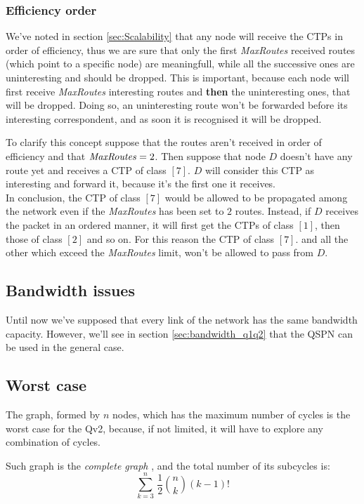 \documentclass[a4paper]{article}
\begin{document}
\subsubsection{Efficiency order}
\label{sec:eff_order}

We've noted in section \ref{sec:Scalability} that any node will receive the
CTPs in order of efficiency, thus we are sure that only the first
\emph{MaxRoutes} received routes (which point to a specific node) are
meaningfull, while all the successive ones are uninteresting and should be
dropped. This is important, because each
node will first receive \emph{MaxRoutes} interesting routes and
\textbf{then} the uninteresting ones, that will be dropped. 
Doing so, an uninteresting route won't be forwarded before its interesting
correspondent, and as soon it is recognised it will be dropped.

To clarify this concept suppose that the routes aren't received in order of
efficiency and that $\textrm{\emph{MaxRoutes}}=2$. Then suppose that node $D$ doesn't
have any route yet and receives a CTP of class $[7]$. $D$ will consider this
CTP as interesting and forward it, because it's the first one it receives.\\
In conclusion, the CTP of class $[7]$ would be allowed to be propagated among
the network even if the \emph{MaxRoutes} has been set to $2$ routes.
Instead, if $D$ receives the packet in an ordered
manner, it will first get the CTPs of class $[1]$, then those of class $[2]$
and so on. For this reason the CTP of class $[7]$. and all the other which
exceed the \emph{MaxRoutes} limit, won't be allowed to pass from $D$.

\subsection{Bandwidth issues}
Until now we've supposed that every link of the network has the same bandwidth
capacity. However, we'll see in section \ref{sec:bandwidth_q1q2} that the QSPN
can be used in the general case.

\subsection{Worst case}
The graph, formed by $n$ nodes, which has the maximum number of cycles is the
worst case for the Qv2, because, if not limited, it will have to explore any
combination of cycles.

Such graph is the \emph{complete graph} \cite{completegraph}, and the total
number of its subcycles is:
\[
\sum_{k=3}^n\,\frac{1}{2}\binom{n}{k}(k-1)!
\]
\end{document}
